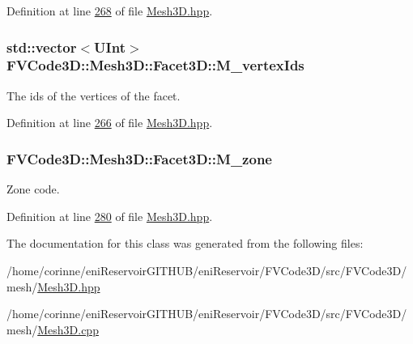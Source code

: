 Definition at line \hyperlink{Mesh3D_8hpp_source_l00268}{268} of file \hyperlink{Mesh3D_8hpp_source}{Mesh3\+D.\+hpp}.

\subsubsection[{\texorpdfstring{M\+\_\+vertex\+Ids}{M_vertexIds}}]{\setlength{\rightskip}{0pt plus 5cm}std\+::vector$<${\bf U\+Int}$>$ F\+V\+Code3\+D\+::\+Mesh3\+D\+::\+Facet3\+D\+::\+M\+\_\+vertex\+Ids\hspace{0.3cm}{\ttfamily [private]}}\hypertarget{classFVCode3D_1_1Mesh3D_1_1Facet3D_ae763d815d2b4406b2f09d0ee5133392c}{}\label{classFVCode3D_1_1Mesh3D_1_1Facet3D_ae763d815d2b4406b2f09d0ee5133392c}


The ids of the vertices of the facet. 



Definition at line \hyperlink{Mesh3D_8hpp_source_l00266}{266} of file \hyperlink{Mesh3D_8hpp_source}{Mesh3\+D.\+hpp}.

\subsubsection[{\texorpdfstring{M\+\_\+zone}{M_zone}}]{ F\+V\+Code3\+D\+::\+Mesh3\+D\+::\+Facet3\+D\+::\+M\+\_\+zone\hspace{0.3cm}{\ttfamily [private]}}\hypertarget{classFVCode3D_1_1Mesh3D_1_1Facet3D_afdbaf5ef57c9020b773f4fcf1e6131bb}{}\label{classFVCode3D_1_1Mesh3D_1_1Facet3D_afdbaf5ef57c9020b773f4fcf1e6131bb}


Zone code. 



Definition at line \hyperlink{Mesh3D_8hpp_source_l00280}{280} of file \hyperlink{Mesh3D_8hpp_source}{Mesh3\+D.\+hpp}.



The documentation for this class was generated from the following files\+:\begin{DoxyCompactItemize}
\item 
/home/corinne/eni\+Reservoir\+G\+I\+T\+H\+U\+B/eni\+Reservoir/\+F\+V\+Code3\+D/src/\+F\+V\+Code3\+D/mesh/\hyperlink{Mesh3D_8hpp}{Mesh3\+D.\+hpp}\item 
/home/corinne/eni\+Reservoir\+G\+I\+T\+H\+U\+B/eni\+Reservoir/\+F\+V\+Code3\+D/src/\+F\+V\+Code3\+D/mesh/\hyperlink{Mesh3D_8cpp}{Mesh3\+D.\+cpp}\end{DoxyCompactItemize}
